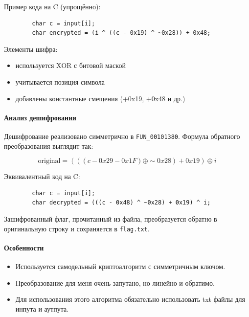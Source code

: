     Пример кода на C (упрощённо):
    \begin{verbatim}
        char c = input[i];
        char encrypted = (i ^ ((c - 0x19) ^ ~0x28)) + 0x48;
    \end{verbatim}

    Элементы шифра:
    \begin{itemize}
        \item используется XOR с битовой маской
        \item учитывается позиция символа
        \item добавлены константные смещения (+0x19, +0x48 и др.)
    \end{itemize}

    \paragraph{Анализ дешифрования}

    Дешифрование реализовано симметрично в \texttt{FUN\_00101380}.
    Формула обратного преобразования выглядит так:

    \[
        \text{original} = (((c - 0x29 - 0x1F) \oplus \sim 0x28) + 0x19) \oplus i
    \]

    Эквивалентный код на C:

    \begin{verbatim}
        char c = input[i];
        char decrypted = (((c - 0x48) ^ ~0x28) + 0x19) ^ i;
    \end{verbatim}

    Зашифрованный флаг, прочитанный из файла, преобразуется обратно в оригинальную строку и сохраняется в \texttt{flag.txt}.

    \paragraph{Особенности}

    \begin{itemize}
        \item Используется самодельный криптоалгоритм с симметричным ключом.
        \item Преобразование для меня очень запутано, но линейно и обратимо.
        \item Для использования этого алгоритма обязательно использовать txt файлы для инпута и аутпута.
    \end{itemize}

